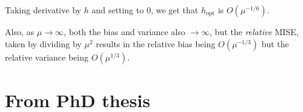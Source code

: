 Taking derivative by \(h\) and setting to \(0\), we get that \(h_{\mbox{opt}}\) is \(O(\mu^{-1/6})\).

Also, as \(\mu \to \infty\), both the bias and variance also \(\to \infty\),
but the \textit{relative} MISE, taken by dividing by \(\mu^2\) results in the relative bias being \(O(\mu^{-1/3})\)
but the relative variance being \(O(\mu^{1/3})\).



\section{From PhD thesis}

